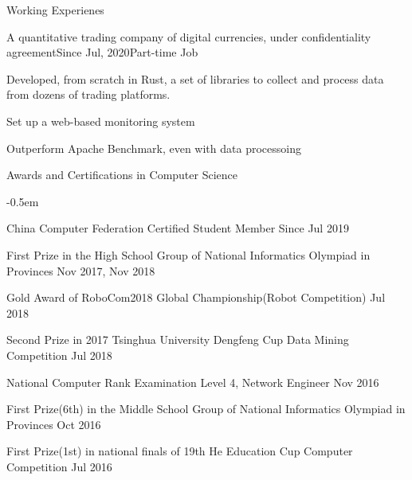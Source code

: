 \documentclass{resume} %
\begin{document}
\begin{rSection}{Working Experienes}
    \begin{rSubsection}{A quantitative trading company of digital currencies, under confidentiality agreement}{Since Jul, 2020}{Part-time Job}{}
        \item Developed, from scratch in Rust, a set of libraries to collect and process data from dozens of trading platforms.
        \item Set up a web-based monitoring system
        \item Outperform Apache Benchmark, even with data processoing
\end{rSubsection}

\end{rSection}
\begin{rSection}{Awards and Certifications in Computer Science}
    \begin{list}{}{
        \setlength{\leftmargin}{0.0em}
        \itemsep -0.5em
      }

    
    \item China Computer Federation Certified Student Member \hfill Since Jul 2019

    \item First Prize in the High School Group of National Informatics Olympiad in Provinces \hfill Nov 2017, Nov 2018
    \item Gold Award of RoboCom2018 Global Championship(Robot Competition) \hfill Jul 2018
    \item Second Prize in 2017 Tsinghua University Dengfeng Cup Data Mining Competition \hfill Jul 2018
    \item National Computer Rank Examination Level 4, Network Engineer \hfill Nov 2016
    \item First Prize(6th) in the Middle School Group of National Informatics Olympiad in Provinces \hfill Oct 2016
    \item First Prize(1st) in national finals of 19th He Education Cup Computer Competition \hfill Jul 2016
    

\end{list}
\end{rSection}
\end{document}
